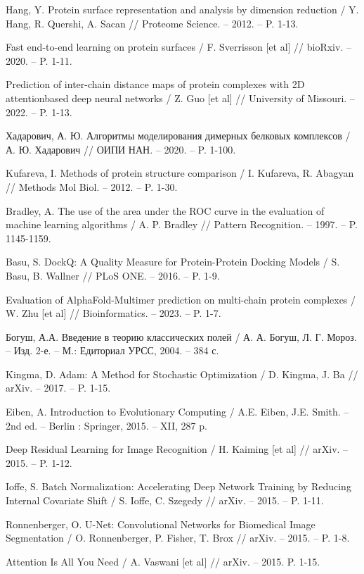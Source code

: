 \begin{thebibliography}{9}
Hang, Y. Protein surface representation and analysis by dimension reduction / Y. Hang, R. Quershi, A. Sacan // Proteome Science. – 2012. – P. 1-13.

Fast end-to-end learning on protein surfaces / F. Sverrisson [et al] // bioRxiv. – 2020. – P. 1-11.

Prediction of inter-chain distance maps of protein complexes with 2D attentionbased deep neural networks / Z. Guo [et al] // University of Missouri. – 2022. – P. 1-13.

Хадарович, А. Ю. Алгоритмы моделирования димерных белковых комплексов / А. Ю. Хадарович // ОИПИ НАН. – 2020. – P. 1-100.

Kufareva, I. Methods of protein structure comparison / I. Kufareva, R. Abagyan // Methods Mol Biol. – 2012. – P. 1-30.

Bradley, A. The use of the area under the ROC curve in the evaluation of machine learning algorithms / A. P. Bradley // Pattern Recognition. – 1997. – P. 1145-1159.

Basu, S. DockQ: A Quality Measure for Protein-Protein Docking Models / S. Basu, B. Wallner // PLoS ONE. – 2016. – P. 1-9.

Evaluation of AlphaFold-Multimer prediction on multi-chain protein complexes / W. Zhu [et al] // Bioinformatics. -- 2023. -- P. 1-7.

Богуш, А.А. Введение в теорию классических полей / А. А. Богуш, Л. Г. Мороз. -- Изд. 2-е. -- М.: Едиториал УРСС, 2004. -- 384 с.

Kingma, D. Adam: A Method for Stochastic Optimization / D. Kingma, J. Ba // arXiv. -- 2017. -- P. 1-15.

Eiben, A. Introduction to Evolutionary Computing / A.E. Eiben, J.E. Smith. -- 2nd ed. -- Berlin : Springer, 2015. -- XII, 287 p.

Deep Residual Learning for Image Recognition / H. Kaiming [et al] // arXiv. – 2015. – P. 1-12.

Ioffe, S. Batch Normalization: Accelerating Deep Network Training by Reducing Internal Covariate Shift / S. Ioffe, C. Szegedy // arXiv. – 2015. – P. 1-11.

Ronnenberger, O. U-Net: Convolutional Networks for Biomedical Image Segmentation / O. Ronnenberger, P. Fisher, T. Brox // arXiv. – 2015. – P. 1-8.

Attention Is All You Need / A. Vaswani [et al] // arXiv. – 2015. P. 1-15.

\end{thebibliography}